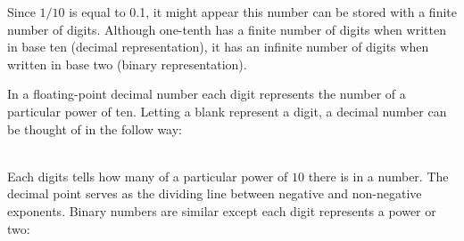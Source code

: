Since $1/10$ is equal to 0.1, it might appear this number can be stored
with a finite number of digits.  Although one-tenth has a finite
number of digits when written in base ten (decimal representation), it
has an infinite number of digits when written in base two (binary
representation).

In a floating-point decimal number each digit represents the number of
a particular power of ten.  Letting a blank represent a digit, 
a decimal number can be thought of in the follow way:\\
\\
Each digits tells how many of a particular power of $10$ there is in a
number.  The decimal point serves as the dividing line between
negative and non-negative exponents.  Binary numbers are similar
except each digit represents a power or two:\\

